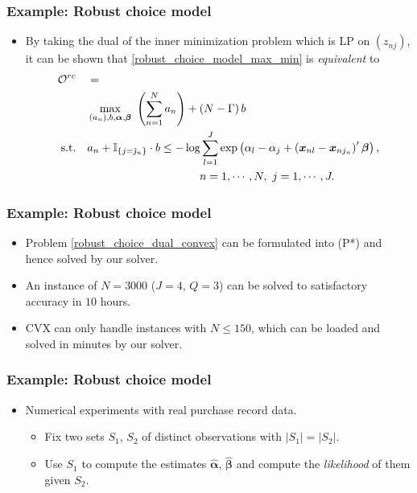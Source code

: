 \documentclass{beamer}
\begin{document}
\begin{frame}
	\frametitle{Example: Robust choice model}
	\begin{itemize}
		\item By taking the dual of the inner minimization problem which is LP on $\left(z_{nj}\right)$, it can be shown that \eqref{robust_choice_model_max_min} is \textit{equivalent} to
		\begin{align}\label{robust_choice_dual_convex}
		\begin{split}
		\mathcal{O}^{rc}\quad  &=\quad 
		\\&\max_{\left(a_n\right),b, \boldsymbol{\alpha}, \boldsymbol{\beta}}\  \left(\sum_{n=1}^N a_n\right)+\left(N-\Gamma\right)b \\
		\textnormal{s.t.}\quad & a_n +  \mathbb{I}_{\left\{j=\hat{\jmath}_n\right\}}\cdot b \leq -\log \sum_{l=1}^J \exp\left(\alpha_l - \alpha_j + \left(\boldsymbol{x}_{nl}-\boldsymbol{x}_{nj_n}\right)'\boldsymbol{\beta}\right),\\ &\quad \quad \quad \quad \quad \quad \quad \quad \quad \quad n=1,\cdots, N,\ j=1,\cdots, J. \\
		\end{split}
		\end{align}
	\end{itemize}
\end{frame}

\begin{frame}
	\frametitle{Example: Robust choice model}
	\begin{itemize}
		\item Problem \eqref{robust_choice_dual_convex} can be formulated into (P*) and hence solved by our solver. 
		\item An instance of $N=3000$ ($J=4$, $Q=3$) can be solved to satisfactory accuracy in $10$ hours.
		\item CVX can only handle instances with $N\leq 150$, which can be loaded and solved in minutes by our solver.
	\end{itemize}
\end{frame}

\begin{frame}
	\frametitle{Example: Robust choice model}
	\begin{itemize}
		\item Numerical experiments with real purchase record data.
		\begin{itemize}
			\item Fix two sets $S_1$, $S_2$ of distinct observations with $|S_1|=|S_2|$.
			\item Use $S_1$ to compute the estimates $\hat{\boldsymbol{\alpha}}$, $\hat{\boldsymbol{\beta}}$ and compute the \textit{likelihood} of them given $S_2$.
		\end{itemize}
	\end{itemize}
\end{frame}
\end{document}
